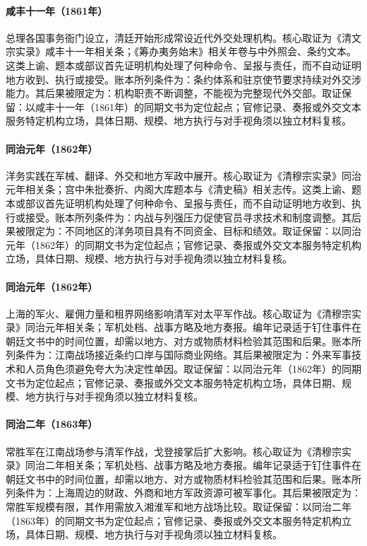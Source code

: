 \hypertarget{ledger:EQ-1861-ZONGLI-YAMEN}{}\paragraph{咸丰十一年（1861年）}总理各国事务衙门设立，清廷开始形成常设近代外交处理机构。核心取证为《清文宗实录》咸丰十一年相关条；《筹办夷务始末》相关年卷与中外照会、条约文本。这类上谕、题本或部议首先证明机构处理了何种命令、呈报与责任，而不自动证明地方收到、执行或接受。账本所列条件为：条约体系和驻京使节要求持续对外交涉能力。其后果被限定为：机构职责不断调整，不能视为完整现代外交部。取证保留：以咸丰十一年（1861年）的同期文书为定位起点；官修记录、奏报或外交文本服务特定机构立场，具体日期、规模、地方执行与对手视角须以独立材料复核。
\hypertarget{ledger:EQ-1862-SELF-STRENGTHENING-ORIGINS}{}\paragraph{同治元年（1862年）}洋务实践在军械、翻译、外交和地方军政中展开。核心取证为《清穆宗实录》同治元年相关条；宫中朱批奏折、内阁大库题本与《清史稿》相关志传。这类上谕、题本或部议首先证明机构处理了何种命令、呈报与责任，而不自动证明地方收到、执行或接受。账本所列条件为：内战与列强压力促使官员寻求技术和制度调整。其后果被限定为：不同地区的洋务项目具有不同资金、目标和绩效。取证保留：以同治元年（1862年）的同期文书为定位起点；官修记录、奏报或外交文本服务特定机构立场，具体日期、规模、地方执行与对手视角须以独立材料复核。
\hypertarget{ledger:EQ-1862-SHANGHAI-FOREIGN-ARMS}{}\paragraph{同治元年（1862年）}上海的军火、雇佣力量和租界网络影响清军对太平军作战。核心取证为《清穆宗实录》同治元年相关条；军机处档、战事方略及地方奏报。编年记录适于钉住事件在朝廷文书中的时间位置，却需以地方、对方或物质材料检验其范围和后果。账本所列条件为：江南战场接近条约口岸与国际商业网络。其后果被限定为：外来军事技术和人员角色须避免夸大为决定性单因。取证保留：以同治元年（1862年）的同期文书为定位起点；官修记录、奏报或外交文本服务特定机构立场，具体日期、规模、地方执行与对手视角须以独立材料复核。
\hypertarget{ledger:EQ-1863-EVER-VICTORIOUS-ARMY}{}\paragraph{同治二年（1863年）}常胜军在江南战场参与清军作战，戈登接掌后扩大影响。核心取证为《清穆宗实录》同治二年相关条；军机处档、战事方略及地方奏报。编年记录适于钉住事件在朝廷文书中的时间位置，却需以地方、对方或物质材料检验其范围和后果。账本所列条件为：上海周边的财政、外商和地方军政资源可被军事化。其后果被限定为：常胜军规模有限，其作用需放入湘淮军和地方战场比较。取证保留：以同治二年（1863年）的同期文书为定位起点；官修记录、奏报或外交文本服务特定机构立场，具体日期、规模、地方执行与对手视角须以独立材料复核。

